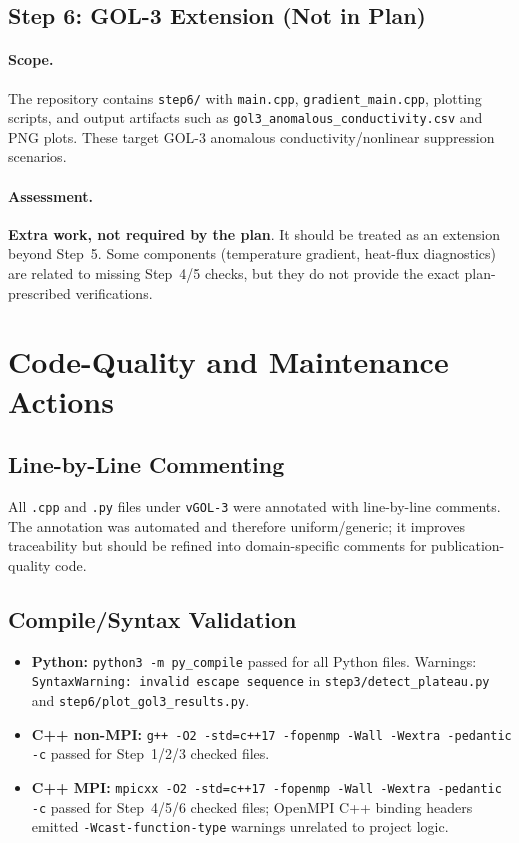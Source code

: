 \documentclass[11pt,a4paper]{article}
\begin{document}
\subsection{Step 6: GOL-3 Extension (Not in Plan)}

\paragraph{Scope.}
The repository contains \texttt{step6/} with \texttt{main.cpp}, \texttt{gradient\_main.cpp}, plotting scripts, and output artifacts such as \texttt{gol3\_anomalous\_conductivity.csv} and PNG plots. These target GOL-3 anomalous conductivity/nonlinear suppression scenarios.

\paragraph{Assessment.}
\textbf{Extra work, not required by the plan}. It should be treated as an extension beyond Step~5. Some components (temperature gradient, heat-flux diagnostics) are related to missing Step~4/5 checks, but they do not provide the exact plan-prescribed verifications.

\section{Code-Quality and Maintenance Actions}

\subsection{Line-by-Line Commenting}
All \texttt{.cpp} and \texttt{.py} files under \texttt{vGOL-3} were annotated with line-by-line comments. The annotation was automated and therefore uniform/generic; it improves traceability but should be refined into domain-specific comments for publication-quality code.

\subsection{Compile/Syntax Validation}
\begin{itemize}[leftmargin=*]
  \item \textbf{Python:} \texttt{python3 -m py\_compile} passed for all Python files. Warnings: \texttt{SyntaxWarning: invalid escape sequence} in \texttt{step3/detect\_plateau.py} and \texttt{step6/plot\_gol3\_results.py}.
  \item \textbf{C++ non-MPI:} \texttt{g++ -O2 -std=c++17 -fopenmp -Wall -Wextra -pedantic -c} passed for Step~1/2/3 checked files.
  \item \textbf{C++ MPI:} \texttt{mpicxx -O2 -std=c++17 -fopenmp -Wall -Wextra -pedantic -c} passed for Step~4/5/6 checked files; OpenMPI C++ binding headers emitted \texttt{-Wcast-function-type} warnings unrelated to project logic.
\end{itemize}
\end{document}
